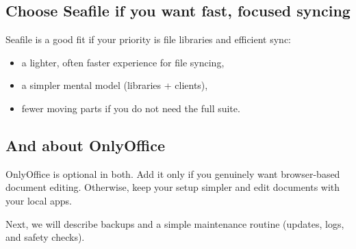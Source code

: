 \subsection*{Choose Seafile if you want fast, focused syncing}
Seafile is a good fit if your priority is file libraries and efficient sync:
\begin{itemize}[leftmargin=*]
  \item a lighter, often faster experience for file syncing,
  \item a simpler mental model (libraries + clients),
  \item fewer moving parts if you do not need the full suite.
\end{itemize}

\subsection*{And about OnlyOffice}
OnlyOffice is optional in both.
Add it only if you genuinely want browser-based document editing.
Otherwise, keep your setup simpler and edit documents with your local apps.



Next, we will describe backups and a simple maintenance routine (updates, logs, and safety checks). 
